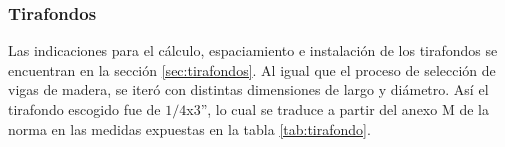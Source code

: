 \subsubsection{Tirafondos}
Las indicaciones para el cálculo, espaciamiento e instalación de los tirafondos se encuentran en la sección \ref{sec:tirafondos}. Al igual que el proceso de selección de vigas de madera, se iteró con distintas dimensiones de largo y diámetro. Así el tirafondo escogido fue de $1/4$x3'', lo cual se traduce a partir del anexo M de la norma en las medidas expuestas en la tabla \ref{tab:tirafondo}.
\begin{table}[h]
\centering
{}
\caption{Dimensiones del tirafondo utilizado}
\label{tab:tirafondo}
\end{table}

